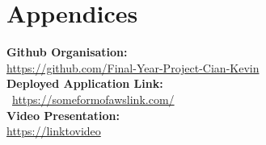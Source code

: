 \chapter{Appendices}

\textbf{Github Organisation: }\\ \noindent\textcolor{NavyBlue}{\url{https://github.com/Final-Year-Project-Cian-Kevin}}\\

\noindent\textbf{Deployed Application Link: }\\\ \noindent\textcolor{NavyBlue}{\url{https://someformofawslink.com/}}\\

\noindent\textbf{Video Presentation: }\\ \noindent\textcolor{NavyBlue}{\url{https://linktovideo}}